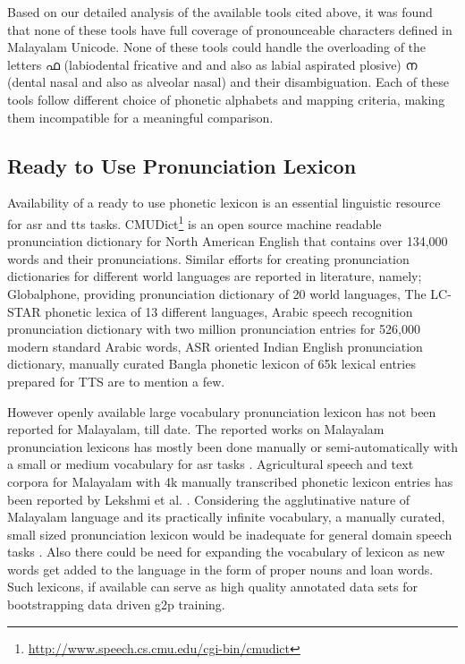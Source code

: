 Based on our detailed analysis of the available tools cited above, it was found
that none of these tools have full coverage of pronounceable characters defined
in Malayalam Unicode. None of these tools could handle the overloading of the
letters {\mal ഫ }(labiodental fricative and and also as labial aspirated
plosive) {\mal ന }(dental nasal and also as alveolar nasal) and their
disambiguation. Each of these tools follow different choice of phonetic
alphabets and mapping criteria, making them incompatible for a meaningful
comparison.

\subsection{Ready to Use Pronunciation Lexicon}
\label{sec:Literature-pl}

Availability of a ready to use phonetic lexicon is an essential linguistic
resource for \gls{asr} and \gls{tts} tasks.
CMUDict\footnote{\url{http://www.speech.cs.cmu.edu/cgi-bin/cmudict}} is an
open source machine readable pronunciation dictionary for North American
English that contains over 134,000 words and their
pronunciations\cite{lenzo2007cmu}. Similar efforts for creating pronunciation
dictionaries for different world languages are reported in literature, namely;
Globalphone, providing pronunciation dictionary of 20 world
languages\cite{schultz-schlippe-2014-globalphone}, The LC-STAR phonetic lexica
of 13 different languages\cite{castell2004lc}, Arabic speech recognition
pronunciation dictionary with two million pronunciation entries for 526,000
modern standard Arabic words\cite{ali2017}, ASR oriented Indian English
pronunciation dictionary\cite{huang-etal-2020-construction}, manually curated
Bangla phonetic lexicon of 65k lexical entries prepared for TTS
\cite{ttsbangla} are to mention a few.

However openly available large vocabulary pronunciation lexicon has not been
reported for Malayalam, till date. The reported works on Malayalam
pronunciation lexicons has mostly been done manually or semi-automatically with
a small or medium vocabulary for \gls{asr} tasks \cite{cinikurian,deekshitha}.
Agricultural speech and text corpora for Malayalam with 4k manually transcribed
phonetic lexicon entries has been reported by Lekshmi et al.
\cite{k-r-etal-2020-malayalam}. Considering the agglutinative nature of
Malayalam language and its practically infinite vocabulary, a manually curated,
small sized pronunciation lexicon would be inadequate for general domain speech
tasks \cite{manohar_quantitative_2020}. Also there could be need for expanding
the vocabulary of lexicon as new words get added to the language in the form of
proper nouns and loan words. Such lexicons, if available can serve as high quality annotated
data sets for bootstrapping data driven  \gls{g2p} training.



